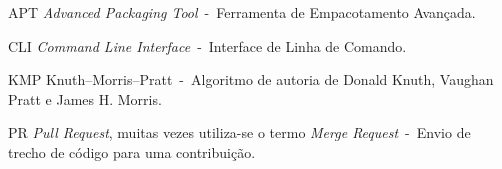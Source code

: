 \begin{siglas}
  \item[APT] \textit{Advanced Packaging Tool}~-~Ferramenta de Empacotamento Avançada.
  \item [CLI] \textit{Command Line Interface}~-~Interface de Linha de Comando.
  \item [KMP] Knuth–Morris–Pratt~-~Algoritmo de autoria de Donald Knuth, Vaughan Pratt e James H. Morris.
  \item [PR] \textit{Pull Request}, muitas vezes utiliza-se o termo \textit{Merge Request}~-~Envio de trecho de código para uma contribuição.
\end{siglas}
